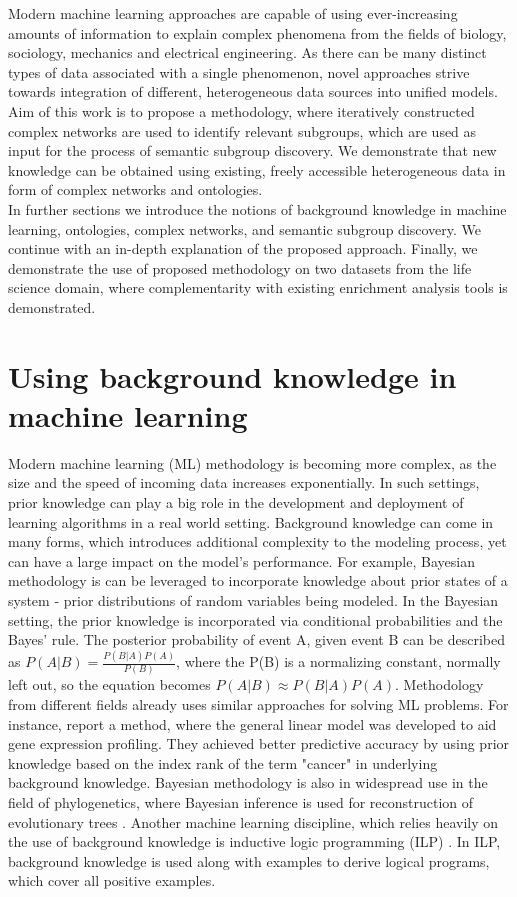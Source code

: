\documentclass[oribibl,runningheads,a4paper]{llncs}
\begin{document}
Modern machine learning approaches are capable of using ever-increasing amounts of information to explain complex phenomena from the fields of biology, sociology, mechanics and electrical engineering. As there can be many distinct types of data associated with a single phenomenon, novel approaches strive towards integration of different, heterogeneous data sources into unified models. Aim of this work is to propose a methodology, where iteratively constructed complex networks are used to identify relevant subgroups, which are used as input for the process of semantic subgroup discovery. We demonstrate that new knowledge can be obtained using existing, freely accessible heterogeneous data in form of complex networks and ontologies. \\
\indent In further sections we introduce the notions of background knowledge in machine learning, ontologies, complex networks, and semantic subgroup discovery. We continue with an in-depth explanation of the proposed approach. Finally, we demonstrate the use of proposed methodology on two datasets from the life science domain, where complementarity with existing enrichment analysis tools is demonstrated.

\section{Using background knowledge in machine learning}

Modern machine learning (ML) methodology is becoming more complex, as the size and the speed of incoming data increases exponentially. In such settings, prior knowledge can play a big role in the development and deployment of learning algorithms in a real world setting. Background knowledge can come in many forms, which introduces additional complexity to the modeling process, yet can have a large impact on the model's performance. For example, Bayesian methodology is can be leveraged to incorporate knowledge about prior states of a system - prior distributions of random variables being modeled. In the Bayesian setting, the prior knowledge is incorporated via conditional probabilities and the Bayes' rule. The posterior probability of event A, given event B can be described as $P(A|B) = \frac{P(B|A)P(A)}{P(B)}$, where the P(B) is a normalizing constant, normally left out, so the equation becomes $ P(A|B) \approx  P(B|A) P(A) $. Methodology from different fields already uses similar approaches for solving ML problems. For instance, \citeauthor{Madahian2015} \cite{Madahian2015} report a method, where the general linear model was developed to aid gene expression profiling. They achieved better predictive accuracy by using prior knowledge based on the index rank of the term "cancer" in underlying background knowledge. Bayesian methodology is also in widespread use in the field of phylogenetics, where Bayesian inference is used for reconstruction of evolutionary trees \cite{drummond2007beast,huelsenbeck2001mrbayes,zou2005new}. Another machine learning discipline, which relies heavily on the use of background knowledge is inductive logic programming (ILP) \cite{lavrac1994inductive}. In ILP, background knowledge is used along with examples to derive logical programs, which cover all positive examples. 
\end{document}
